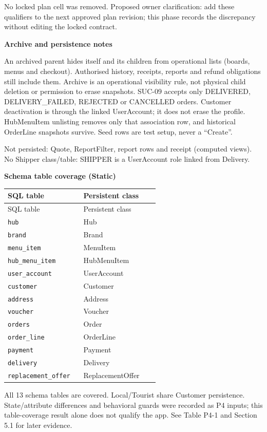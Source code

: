 No locked plan cell was removed. Proposed owner clarification: add these qualifiers to the next approved plan revision; this phase records the discrepancy without editing the locked contract.

\textbf{Archive and persistence notes}

An archived parent hides itself and its children from operational lists (boards, menus and checkout). Authorised history, receipts, reports and refund obligations still include them. Archive is an operational visibility rule, not physical child deletion or permission to erase snapshots. SUC-09 accepts only DELIVERED, DELIVERY\_FAILED, REJECTED or CANCELLED orders. Customer deactivation is through the linked UserAccount; it does not erase the profile. HubMenuItem unlisting removes only that association row, and historical OrderLine snapshots survive. Seed rows are test setup, never a ``Create''.

Not persisted: Quote, ReportFilter, report rows and receipt (computed views). No Shipper class/table: SHIPPER is a UserAccount role linked from Delivery.

\textbf{Schema table coverage (Static)}

\begin{longtable}{>{\raggedright\arraybackslash}p{0.4600\linewidth}>{\raggedright\arraybackslash}p{0.4600\linewidth}}
SQL table & Persistent class \\
\hline\endfirsthead
SQL table & Persistent class \\
\hline\endhead
\texttt{hub} & Hub \\
\texttt{brand} & Brand \\
\texttt{menu\_\allowbreak{}item} & MenuItem \\
\texttt{hub\_\allowbreak{}menu\_\allowbreak{}item} & HubMenuItem \\
\texttt{user\_\allowbreak{}account} & UserAccount \\
\texttt{customer} & Customer \\
\texttt{address} & Address \\
\texttt{voucher} & Voucher \\
\texttt{orders} & Order \\
\texttt{order\_\allowbreak{}line} & OrderLine \\
\texttt{payment} & Payment \\
\texttt{delivery} & Delivery \\
\texttt{replacement\_\allowbreak{}offer} & ReplacementOffer \\
\end{longtable}
All 13 schema tables are covered. Local/Tourist share Customer persistence. State/attribute differences and behavioral guards were recorded as P4 inputs; this table-coverage result alone does not qualify the app. See Table P4-1 and Section 5.1 for later evidence.
